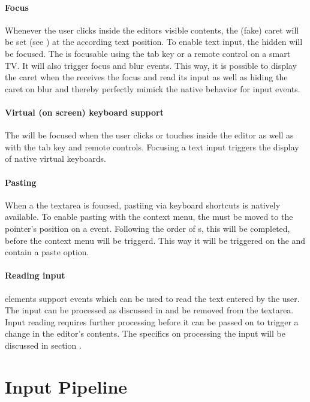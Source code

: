 \paragraph{Focus} Whenever the user clicks inside the editors visible contents, the (fake) caret will be set (see ) at the according text position. To enable text input, the hidden  will be focused. The  is focusable using the tab key or a remote control on a smart TV. It will also trigger focus and blur events. This way, it is possible to display the caret when the  receives the focus and read its input as well as hiding the caret on blur and thereby perfectly mimick the native behavior for input events.

\paragraph{Virtual (on screen) keyboard support} The  will be focused when the user clicks or touches inside the editor as well as with the tab key and remote controls. Focusing a text input triggers the display of native virtual keyboards.

\paragraph{Pasting} When a the textarea is foucsed, pastiing via keyboard shortcuts is natively available. To enable pasting with the context menu, the  must be moved to the pointer's position on a  event. Following the order of s, this will be completed, before the context menu will be triggerd. This way it will be triggered on the  and contain a paste option.

\paragraph{Reading input}  elements support  events which can be used to read the text entered by the user. The input can be processed as discussed in  and be removed from the textarea. Input reading requires further processing before it can be passed on to trigger a change in the editor's contents. The specifics on processing the input will be discussed in section .

\section{Input Pipeline}
\label{sec:input_pipeline}

